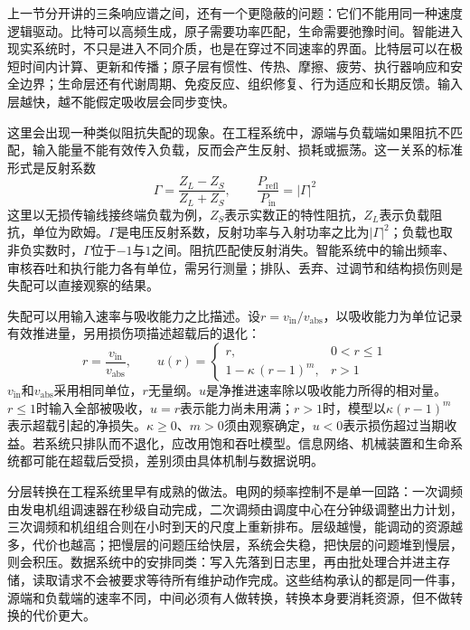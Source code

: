 
上一节分开讲的三条响应谱之间，还有一个更隐蔽的问题：它们不能用同一种速度逻辑驱动。比特可以高频生成，原子需要功率匹配，生命需要弛豫时间。智能进入现实系统时，不只是进入不同介质，也是在穿过不同速率的界面。比特层可以在极短时间内计算、更新和传播；原子层有惯性、传热、摩擦、疲劳、执行器响应和安全边界；生命层还有代谢周期、免疫反应、组织修复、行为适应和长期反馈。输入层越快，越不能假定吸收层会同步变快。

这里会出现一种类似阻抗失配的现象。在工程系统中，源端与负载端如果阻抗不匹配，输入能量不能有效传入负载，反而会产生反射、损耗或振荡。这一关系的标准形式是反射系数
\begin{equation}
\Gamma=\frac{Z_L-Z_S}{Z_L+Z_S},\qquad \frac{P_{\mathrm{refl}}}{P_{\mathrm{in}}}=|\Gamma|^2
\end{equation}
这里以无损传输线接终端负载为例，$Z_S$表示实数正的特性阻抗，$Z_L$表示负载阻抗，单位为欧姆。$\Gamma$是电压反射系数，反射功率与入射功率之比为$|\Gamma|^2$；负载也取非负实数时，$\Gamma$位于$-1$与$1$之间。阻抗匹配使反射消失。智能系统中的输出频率、审核吞吐和执行能力各有单位，需另行测量；排队、丢弃、过调节和结构损伤则是失配可以直接观察的结果。

失配可以用输入速率与吸收能力之比描述。设$r=v_{\mathrm{in}}/v_{\mathrm{abs}}$，以吸收能力为单位记录有效推进量，另用损伤项描述超载后的退化：
\begin{equation}
r=\frac{v_{\mathrm{in}}}{v_{\mathrm{abs}}},
\qquad
u(r)=
\begin{cases}
r, & 0<r\le 1\\[3pt]
1-\kappa\,(r-1)^{m}, & r>1
\end{cases}
\label{eq:rate-mismatch}
\end{equation}
$v_{\mathrm{in}}$和$v_{\mathrm{abs}}$采用相同单位，$r$无量纲。$u$是净推进速率除以吸收能力所得的相对量。$r\le1$时输入全部被吸收，$u=r$表示能力尚未用满；$r>1$时，模型以$\kappa(r-1)^m$表示超载引起的净损失。$\kappa\ge0$、$m>0$须由观察确定，$u<0$表示损伤超过当期收益。若系统只排队而不退化，应改用饱和吞吐模型。信息网络、机械装置和生命系统都可能在超载后受损，差别须由具体机制与数据说明。

分层转换在工程系统里早有成熟的做法。电网的频率控制不是单一回路：一次调频由发电机组调速器在秒级自动完成，二次调频由调度中心在分钟级调整出力计划，三次调频和机组组合则在小时到天的尺度上重新排布。层级越慢，能调动的资源越多，代价也越高；把慢层的问题压给快层，系统会失稳，把快层的问题堆到慢层，则会积压。数据系统中的安排同类：写入先落到日志里，再由批处理合并进主存储，读取请求不会被要求等待所有维护动作完成。这些结构承认的都是同一件事，源端和负载端的速率不同，中间必须有人做转换，转换本身要消耗资源，但不做转换的代价更大。

